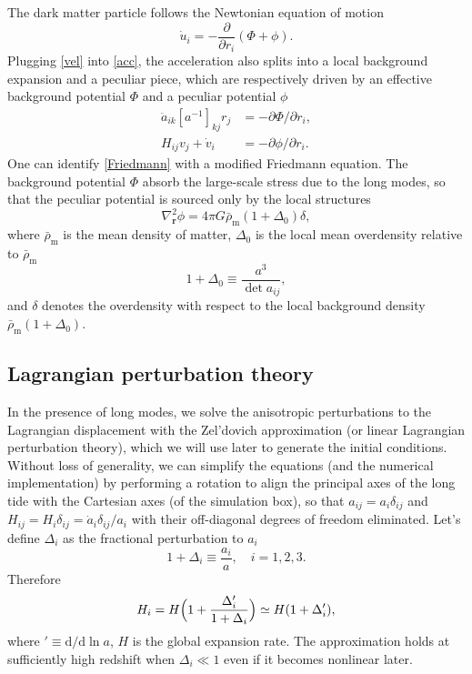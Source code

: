 \documentclass[a4paper,11pt]{article}
\renewcommand{\d}{\mathrm{d}}
\newcommand{\vr}{{\bm r}}
\newcommand{\rhobarm}{{\bar\rho_\mathrm{m}}}
\begin{document}
The dark matter particle follows the Newtonian equation of motion
\begin{equation}
    \dot u_i = - \frac{\partial}{\partial r_i} (\Phi + \phi).
    \label{acc}
\end{equation}
Plugging \eqref{vel} into \eqref{acc}, the acceleration also splits into
a local background expansion and a peculiar piece,
which are respectively driven by an effective background potential $\Phi$ and
a peculiar potential $\phi$
\begin{align}
    \ddot a_{ik} [a^{-1}]_{kj} r_j &= - \partial\Phi / \partial r_i,
    \label{Friedmann} \\
    H_{ij} v_j + \dot v_i &= - \partial\phi / \partial r_i.
    \label{pecvel}
\end{align}
One can identify \eqref{Friedmann} with a modified Friedmann equation.
The background potential $\Phi$ absorb the large-scale stress due to the long
modes, so that the peculiar potential is sourced only by the local structures
\begin{equation}
    \nabla_\vr^2 \phi = 4\pi G \rhobarm (1 + \Delta_0) \delta,
    \label{poisson}
\end{equation}
where $\rhobarm$ is the mean density of matter, $\Delta_0$ is the
local mean overdensity relative to $\rhobarm$
\begin{equation}
    1 + \Delta_0 \equiv \frac{a^3}{\det a_{ij}},
\end{equation}
and $\delta$ denotes the overdensity with respect to the local background
density $\rhobarm (1 + \Delta_0)$.



\subsection{Lagrangian perturbation theory}
\label{sub:lpt}

In the presence of long modes, we solve the anisotropic perturbations to the
Lagrangian displacement with the Zel'dovich approximation (or linear Lagrangian
perturbation theory), which we will use later to generate the initial
conditions.
Without loss of generality, we can simplify the equations (and the numerical
implementation) by performing a rotation to align the principal axes of the
long tide with the Cartesian axes (of the simulation box), so that $a_{ij} =
a_i \delta_{ij}$ and $H_{ij} = H_i \delta_{ij} = \dot a_i \delta_{ij} / a_i$
with their off-diagonal degrees of freedom eliminated.
Let's define $\Delta_i$ as the fractional perturbation to $a_i$
\begin{equation}
    1 + \Delta_i \equiv \frac{a_i} a, \quad i = 1, 2, 3.
\end{equation}
Therefore
\begin{equation}
    H_i = H \Bigl( 1 + \frac{\Delta_i'}{1 + \Delta_i} \Bigr)
    \simeq H ( 1 + \Delta_i' ),
    \label{Hi}
\end{equation}
where $' \equiv \d/\d\ln a$, $H$ is the global expansion rate.
The approximation holds at sufficiently high redshift when $\Delta_i \ll 1$
even if it becomes nonlinear later.
\end{document}

